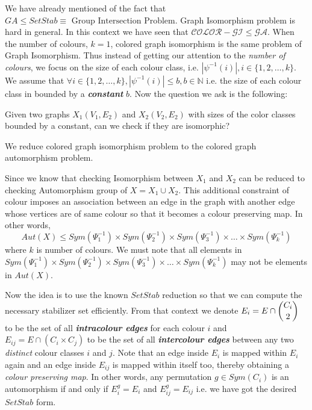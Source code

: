 We have already mentioned of the fact that $GA\leq SetStab\equiv\text{ Group Intersection Problem}$. Graph Isomorphism problem is hard in general. In this context we have seen that $\mathcal{COLOR-GI}\leq \mathcal{GA}$. When the number of colours, $k=1$, colored graph isomorphism is the same problem of Graph Isomorphism. Thus instead of getting our attention to the \emph{number of colours}, we focus on the size of each colour class, i.e. $|\psi^{-1}(i)|, i\in \{1,2,\ldots,k\}$. We assume that $\forall i\in\{1,2,\ldots,k\}, |\psi^{-1}(i)|\leq b, b\in \mathbb{N}$ i.e. the size of each colour class in bounded by a {\bf \emph{constant}} $b$. Now the question we ask is the following:
\begin{problem}
	Given two graphs $X_1(V_1,E_2)$ and $X_2(V_2,E_2)$ with sizes of the color classes bounded by a constant, can we check if they are isomorphic?
\end{problem}

We reduce colored graph isomorphism problem to the colored graph automorphism problem.

Since we know that checking Isomorphism between $X_1$ and $X_2$ can be reduced to checking Automorphism group of $X = X_1 \cup X_2$. This additional constraint of colour imposes an association between an edge in the graph with another edge whose vertices are of same colour so that it becomes a colour preserving map. In other words,
\begin{equation*}
	Aut(X)\leq Sym(\Psi^{-1}_1) \times Sym(\Psi^{-1}_2) \times Sym(\Psi^{-1}_3) \times \ldots \times Sym(\Psi^{-1}_k)
\end{equation*}
where $k$ is number of colours. We must note that all elements in $Sym(\Psi^{-1}_1) \times Sym(\Psi^{-1}_2) \times Sym(\Psi^{-1}_3) \times \ldots \times Sym(\Psi^{-1}_k)$ may not be elements in $Aut(X)$. 


Now the idea is to use the known $SetStab$ reduction so that we can compute the necessary stabilizer set efficiently. From that context we denote $E_i = E\cap \dbinom{C_i}{2}$ to be the set of all {\bf \emph{intracolour edges}} for each colour $i$ and $E_{ij} = E\cap (C_i\times C_j)$ to be the set of all {\bf \emph{intercolour edges}} between any two \emph{distinct} colour classes $i$ and $j$. Note that an edge inside $E_i$ is mapped within $E_i$ again and an edge inside $E_{ij}$ is mapped within itself too, thereby obtaining a \emph{colour preserving map}. In other words, any permutation $g \in Sym(C_i)$ is an automorphism if and only if $E_i^g = E_i$ and $E_{ij}^g = E_{ij}$ i.e. we have got the desired $SetStab$ form.



